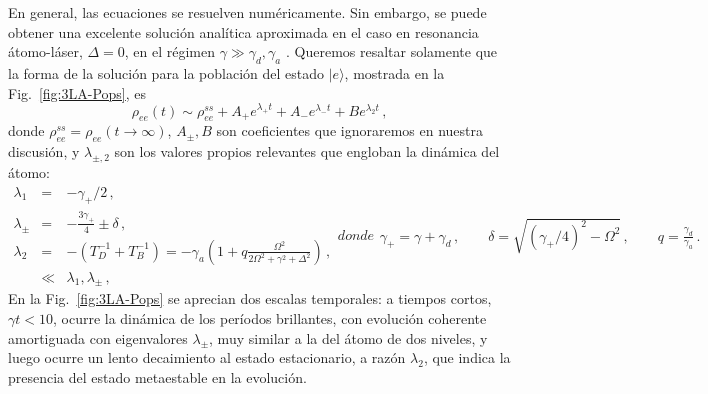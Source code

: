 \documentclass[superscriptaddress,12pt,amsmath]{revtex4-2}
\begin{document}
En general, las ecuaciones se resuelven num\'ericamente. Sin embargo, 
se puede obtener una excelente soluci\'on anal\'itica aproximada en el 
caso en resonancia \'atomo-l\'aser, $\Delta =0$, en el r\'egimen 
$\gamma \gg \gamma_d , \gamma_a$ \cite{CaRG16}. Queremos resaltar 
solamente que la forma de la soluci\'on para la poblaci\'on del estado 
$|e\rangle$, mostrada en la Fig.~\ref{fig:3LA-Pops}, es
%
\begin{equation} 		\label{eq:popE}
\rho_{ee}(t) \sim \rho_{ee}^{ss} +A_+ e^{\lambda_+ t} 
	+A_- e^{\lambda_- t}+B e^{\lambda_2 t}  \,,
\end{equation}
donde $\rho_{ee}^{ss} = \rho_{ee} (t \to \infty)$, $A_{\pm},B$ son 
coeficientes que ignoraremos en nuestra discusi\'on, y 
$\lambda_{\pm,2}$ son los valores propios relevantes que engloban 
la din\'amica del \'atomo: 
%
\begin{subequations}
\begin{eqnarray} 	
\lambda_1 &=& -\gamma_+/2 \,,  \\
%
\lambda_{\pm} &=& -\frac{3\gamma_+}{4} \pm \delta  \,,     \\
%
\lambda_2 &=& -(T_D^{-1} +T_B^{-1})   
	= -\gamma_a \left( 1+ q \frac{\Omega^2 }
	{ 2 \Omega^2 +\gamma^2 +\Delta^2 }  \right) 	\,,  
	\label{eq:small_eigenvalue} \\
	&\ll&  \lambda_1, \lambda_{\pm} \,,  \nonumber 
\end{eqnarray} 
donde 
%
\begin{eqnarray} 	
\gamma_+ = \gamma +\gamma_d \,,	 	\qquad 
\delta =  \sqrt{(\gamma_+/4)^2 - \Omega^2} \,, \qquad 
q = \frac{\gamma_d}{\gamma_a} \,. 
\end{eqnarray}    
\end{subequations}   
En la Fig.~\ref{fig:3LA-Pops} se aprecian dos escalas temporales: a 
tiempos cortos, $\gamma t < 10$, ocurre la din\'amica de los per\'iodos 
brillantes, con evoluci\'on coherente amortiguada con eigenvalores 
$\lambda_{\pm}$, muy similar a la del \'atomo de dos niveles, y luego 
ocurre un lento decaimiento al estado estacionario, a raz\'on $\lambda_2$, 
que indica la presencia del estado metaestable en la evoluci\'on. 
\end{document}
